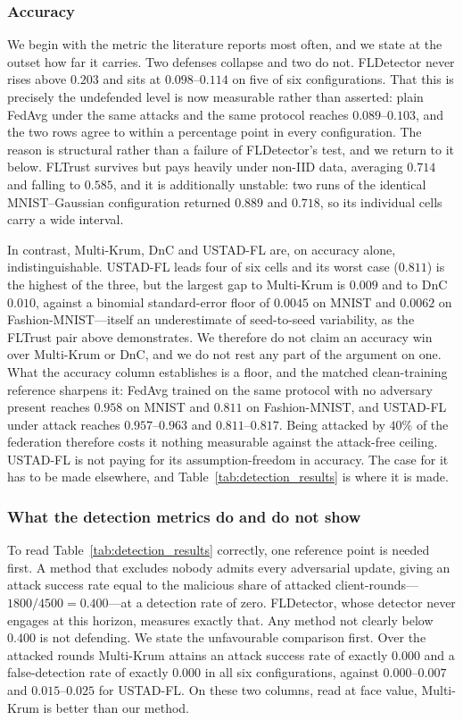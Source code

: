 \documentclass[journal]{IEEEtran}
\begin{document}
\subsubsection{Accuracy}
We begin with the metric the literature reports most often, and we state at the outset how far
it carries. Two defenses collapse and two do not. FLDetector never rises above $0.203$ and sits at
$0.098$--$0.114$ on five of six configurations. That this is precisely the undefended level
is now measurable rather than asserted: plain FedAvg under the same attacks and the same
protocol reaches $0.089$--$0.103$, and the two rows agree to within a percentage point in
every configuration. The reason is structural rather than a failure of FLDetector's test,
and we return to it below. FLTrust
survives but pays heavily under non-IID data, averaging $0.714$ and falling to $0.585$, and
it is additionally unstable: two runs of the identical MNIST--Gaussian configuration
returned $0.889$ and $0.718$, so its individual cells carry a wide interval.

In contrast, Multi-Krum, DnC and USTAD-FL are, on accuracy alone, indistinguishable. USTAD-FL leads four
of six cells and its worst case ($0.811$) is the highest of the three, but the largest gap
to Multi-Krum is $0.009$ and to DnC $0.010$, against a binomial standard-error floor of
$0.0045$ on MNIST and $0.0062$ on Fashion-MNIST---itself an underestimate of seed-to-seed
variability, as the FLTrust pair above demonstrates. We therefore do not claim an accuracy
win over Multi-Krum or DnC, and we do not rest any part of the argument on one. What the
accuracy column establishes is a floor, and the matched clean-training reference sharpens it:
FedAvg trained on the same protocol with no adversary present reaches $0.958$ on MNIST and
$0.811$ on Fashion-MNIST, and USTAD-FL under attack reaches $0.957$--$0.963$ and
$0.811$--$0.817$. Being attacked by $40\%$ of the federation therefore costs it nothing
measurable against the attack-free ceiling. USTAD-FL is not paying for its assumption-freedom
in accuracy. The case for it has to be made elsewhere, and Table~\ref{tab:detection_results} is
where it is made.

\subsubsection{What the detection metrics do and do not show}
To read Table~\ref{tab:detection_results} correctly, one reference point is needed first. A method that excludes nobody admits every adversarial update, giving an attack success rate equal to the malicious share of attacked client-rounds---$1800/4500 = 0.400$---at a detection rate of zero. FLDetector, whose detector never engages at this horizon, measures exactly that. Any method not clearly below $0.400$ is not defending. We state the unfavourable comparison first. Over the attacked rounds Multi-Krum attains an
attack success rate of exactly $0.000$ and a false-detection rate of exactly $0.000$ in all
six configurations, against $0.000$--$0.007$ and $0.015$--$0.025$ for USTAD-FL. On these two
columns, read at face value, Multi-Krum is better than our method.
\end{document}
